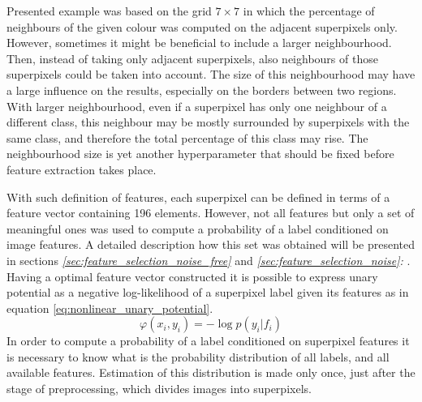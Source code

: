 Presented example was based on the grid $7 \times 7$ in which the percentage of neighbours of the given colour was computed on the adjacent superpixels only. However, sometimes it might be beneficial to include a larger neighbourhood. Then, instead of taking only adjacent superpixels, also neighbours of those superpixels could be taken into account. The size of this neighbourhood may have a large influence on the results, especially on the borders between two regions. With larger neighbourhood, even if a superpixel has only one neighbour of a different class, this neighbour may be mostly surrounded by superpixels with the same class, and therefore the total percentage of this class may rise. The neighbourhood size is yet another hyperparameter that should be fixed before feature extraction takes place.

With such definition of features, each superpixel can be defined in terms of a feature vector containing 196 elements. However, not all features but only a set of meaningful ones was used to compute a probability of a label conditioned on image features. A detailed description how this set was obtained will be presented in sections \textit{ \ref{sec:feature_selection_noise_free}} and \textit{\ref{sec:feature_selection_noise}: }. Having a optimal feature vector constructed it is possible to express unary potential as a negative log-likelihood of a superpixel label given its features as in equation \ref{eq:nonlinear_unary_potential}. 
\begin{equation}
    \label{eq:nonlinear_unary_potential}
    \varphi(x_i,y_i) = -\log p(y_i|f_i)
\end{equation}
In order to compute a probability of a label conditioned on superpixel features it is necessary to know what is the probability distribution of all labels, and all available features. Estimation of this distribution is made only once, just after the stage of preprocessing, which divides images into superpixels. 